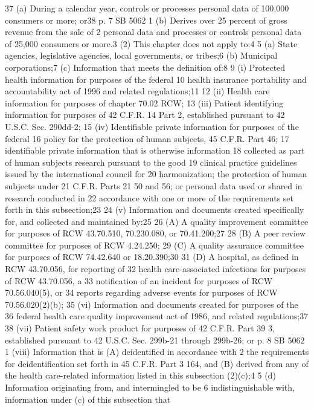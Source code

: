 37 (a) During a calendar year, controls or processes personal data
of 100,000 consumers or more; or38
p. 7 SB 5062
1 (b) Derives over 25 percent of gross revenue from the sale of
2 personal data and processes or controls personal data of 25,000
consumers or more.3
(2) This chapter does not apply to:4
5 (a) State agencies, legislative agencies, local governments, or
tribes;6
(b) Municipal corporations;7
(c) Information that meets the definition of:8
9 (i) Protected health information for purposes of the federal
10 health insurance portability and accountability act of 1996 and
related regulations;11
12 (ii) Health care information for purposes of chapter 70.02 RCW;
13 (iii) Patient identifying information for purposes of 42 C.F.R.
14 Part 2, established pursuant to 42 U.S.C. Sec. 290dd-2;
15 (iv) Identifiable private information for purposes of the federal
16 policy for the protection of human subjects, 45 C.F.R. Part 46;
17 identifiable private information that is otherwise information
18 collected as part of human subjects research pursuant to the good
19 clinical practice guidelines issued by the international council for
20 harmonization; the protection of human subjects under 21 C.F.R. Parts
21 50 and 56; or personal data used or shared in research conducted in
22 accordance with one or more of the requirements set forth in this
subsection;23
24 (v) Information and documents created specifically for, and
collected and maintained by:25
26 (A) A quality improvement committee for purposes of RCW
43.70.510, 70.230.080, or 70.41.200;27
28 (B) A peer review committee for purposes of RCW 4.24.250;
29 (C) A quality assurance committee for purposes of RCW 74.42.640
or 18.20.390;30
31 (D) A hospital, as defined in RCW 43.70.056, for reporting of
32 health care-associated infections for purposes of RCW 43.70.056, a
33 notification of an incident for purposes of RCW 70.56.040(5), or
34 reports regarding adverse events for purposes of RCW 70.56.020(2)(b);
35 (vi) Information and documents created for purposes of the
36 federal health care quality improvement act of 1986, and related
regulations;37
38 (vii) Patient safety work product for purposes of 42 C.F.R. Part
39 3, established pursuant to 42 U.S.C. Sec. 299b-21 through 299b-26; or
p. 8 SB 5062
1 (viii) Information that is (A) deidentified in accordance with
2 the requirements for deidentification set forth in 45 C.F.R. Part
3 164, and (B) derived from any of the health care-related information
listed in this subsection (2)(c);4
5 (d) Information originating from, and intermingled to be
6 indistinguishable with, information under (c) of this subsection that
